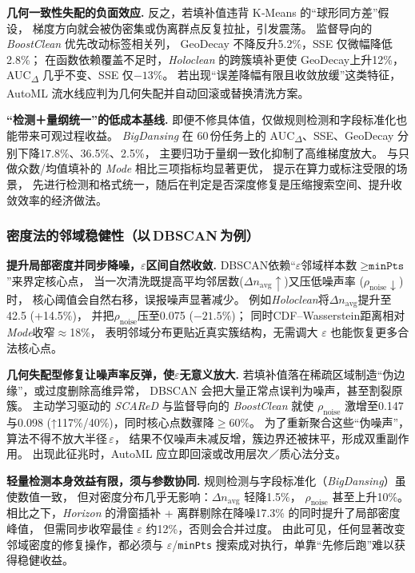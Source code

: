 \documentclass[10pt]{article} %
\numberwithin{equation}{section}
\begin{document}
\medskip
\noindent%
\textbf{几何一致性失配的负面效应.}\;
反之，若填补值违背 K‑Means 的“球形同方差”假设，
梯度方向就会被伪密集或伪离群点反复拉扯，引发震荡。
监督导向的 \textit{BoostClean} 优先改动标签相关列，
GeoDecay 不降反升5.2\%，SSE 仅微幅降低2.8\%；
在函数依赖覆盖不足时，\textit{Holoclean} 的跨簇填补更使 GeoDecay上升12\%，
AUC\textsubscript{$\Delta$} 几乎不变、SSE 仅\(-13\%\)。
若出现“误差降幅有限且收敛放缓”这类特征，
AutoML 流水线应判为几何失配并自动回滚或替换清洗方案。

\medskip
\noindent%
\textbf{“检测＋量纲统一”的低成本基线.}\;
即便不修具体值，仅做规则检测和字段标准化也能带来可观过程收益。
\textit{BigDansing} 在 60 份任务上的 AUC\textsubscript{$\Delta$}、SSE、GeoDecay
分别下降17.8\%、36.5\%、2.5\%，
主要归功于量纲一致化抑制了高维梯度放大。
与只做众数/均值填补的 \textit{Mode} 相比三项指标均显著更优，
提示在算力或标注受限的场景，
先进行检测和格式统一，随后在判定是否深度修复是压缩搜索空间、提升收敛效率的经济做法。


\subsubsection{密度法的邻域稳健性（以 DBSCAN 为例）}
\label{subsec:density_dynamics}

\medskip
\noindent%
\textbf{提升局部密度并同步降噪，$\varepsilon$区间自然收敛.}\;
DBSCAN依赖“$\varepsilon$邻域样本数$\ge\texttt{minPts}$”来界定核心点，
当一次清洗既提高平均邻居数(\(\Delta n_{\text{avg}}\!\uparrow\))又压低噪声率 (\(\rho_{\text{noise}}\!\downarrow\)) 时，
核心阈值会自然右移，误报噪声显著减少。
例如\textit{Holoclean}将\(\Delta n_{\text{avg}}\)提升至42.5 (+14.5\%)，
并把$\rho_{\text{noise}}$压至0.075 (\(-21.5\%\))；
同时CDF–Wasserstein距离相对\textit{Mode}收窄$\approx$18\%，
表明邻域分布更贴近真实簇结构，无需调大 $\varepsilon$ 也能恢复更多合法核心点。

\medskip
\noindent%
\textbf{几何失配型修复让噪声率反弹，使$\varepsilon$无意义放大.}\;
若填补值落在稀疏区域制造“伪边缘”，或过度删除高维异常，
DBSCAN 会把大量正常点误判为噪声，甚至割裂原簇。
主动学习驱动的 \textit{SCAReD} 与监督导向的 \textit{BoostClean} 就使 $\rho_{\text{noise}}$ 激增至0.147与0.098
(↑117\%/40\%)，同时核心点数骤降\(\geq60\%\)。
为了重新聚合这些“伪噪声”，算法不得不放大半径 $\varepsilon$，
结果不仅噪声未减反增，簇边界还被抹平，形成双重副作用。
出现此征兆时，AutoML 应立即回滚或改用层次／质心法分支。

\medskip
\noindent%
\textbf{轻量检测本身效益有限，须与参数协同.}\;
规则检测与字段标准化（\textit{BigDansing}）虽使数值一致，
但对密度分布几乎无影响：\(\Delta n_{\text{avg}}\) 轻降1.5\%，
$\rho_{\text{noise}}$ 甚至上升10\%。
相比之下，\textit{Horizon} 的滑窗插补 + 离群剔除在降噪17.3\% 的同时提升了局部密度峰值，
但需同步收窄最佳 $\varepsilon$ 约12\%，否则会合并过度。
由此可见，任何显著改变邻域密度的修复操作，都必须与 $\varepsilon$/\texttt{minPts} 搜索成对执行，单靠“先修后跑”难以获得稳健收益。
\end{document}
